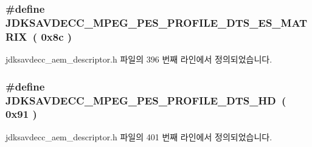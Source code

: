 \subsubsection[{\texorpdfstring{J\+D\+K\+S\+A\+V\+D\+E\+C\+C\+\_\+\+M\+P\+E\+G\+\_\+\+P\+E\+S\+\_\+\+P\+R\+O\+F\+I\+L\+E\+\_\+\+D\+T\+S\+\_\+\+E\+S\+\_\+\+M\+A\+T\+R\+IX}{JDKSAVDECC_MPEG_PES_PROFILE_DTS_ES_MATRIX}}]{\setlength{\rightskip}{0pt plus 5cm}\#define J\+D\+K\+S\+A\+V\+D\+E\+C\+C\+\_\+\+M\+P\+E\+G\+\_\+\+P\+E\+S\+\_\+\+P\+R\+O\+F\+I\+L\+E\+\_\+\+D\+T\+S\+\_\+\+E\+S\+\_\+\+M\+A\+T\+R\+IX~( 0x8c )}\hypertarget{group__mpeg__pes__profile_ga4116234752a5006adbc36e8fa0170c6f}{}\label{group__mpeg__pes__profile_ga4116234752a5006adbc36e8fa0170c6f}


jdksavdecc\+\_\+aem\+\_\+descriptor.\+h 파일의 396 번째 라인에서 정의되었습니다.

\subsubsection[{\texorpdfstring{J\+D\+K\+S\+A\+V\+D\+E\+C\+C\+\_\+\+M\+P\+E\+G\+\_\+\+P\+E\+S\+\_\+\+P\+R\+O\+F\+I\+L\+E\+\_\+\+D\+T\+S\+\_\+\+HD}{JDKSAVDECC_MPEG_PES_PROFILE_DTS_HD}}]{\setlength{\rightskip}{0pt plus 5cm}\#define J\+D\+K\+S\+A\+V\+D\+E\+C\+C\+\_\+\+M\+P\+E\+G\+\_\+\+P\+E\+S\+\_\+\+P\+R\+O\+F\+I\+L\+E\+\_\+\+D\+T\+S\+\_\+\+HD~( 0x91 )}\hypertarget{group__mpeg__pes__profile_ga6812cac54612b98c6c2782fdf5877706}{}\label{group__mpeg__pes__profile_ga6812cac54612b98c6c2782fdf5877706}


jdksavdecc\+\_\+aem\+\_\+descriptor.\+h 파일의 401 번째 라인에서 정의되었습니다.

